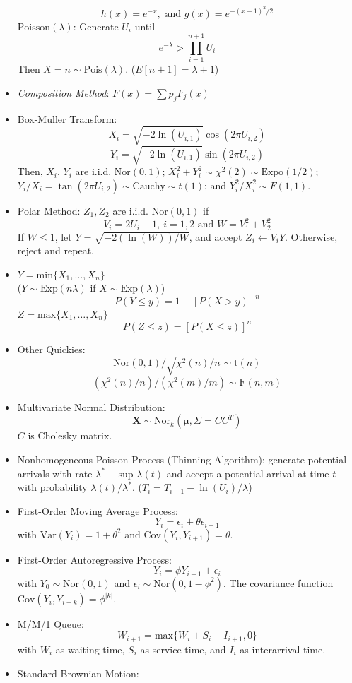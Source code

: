 \documentclass[10pt, twocolumn]{article}
\begin{document}
\begin{itemize}
\[ h(x) = e^{-x}, \text{ and } g(x) = e^{-(x-1)^2/2} \]
$\text{Poisson}(\lambda)$: Generate $U_i$ until 
\[ e^{-\lambda} > \prod_{i=1}^{n+1}U_i \] 
Then $X=n \sim \text{Pois}(\lambda)$. ($E[n+1]=\lambda+1$)
\item \emph{Composition Method}: $F(x)=\sum p_jF_j(x)$
\item Box-Muller Transform: 
\[ X_i=\sqrt{-2\ln(U_{i,1})}\cos(2\pi U_{i,2}) \] 
\[ Y_i=\sqrt{-2\ln(U_{i,1})}\sin(2\pi U_{i,2}) \]
Then, $X_i$, $Y_i$ are i.i.d. $\text{Nor}(0,1)$; $X_i^2+Y_i^2 \sim \chi^2(2) \sim \text{Expo}(1/2)$; $Y_i/X_i = \tan(2 \pi U_{i,2}) \sim \text{Cauchy} \sim t(1)$; and $Y_i^2/X_i^2 \sim F(1,1)$. 
\item Polar Method: $Z_1, Z_2$ are i.i.d. $\text{Nor}(0,1)$ if 
\[ V_i = 2U_i-1,\ i=1,2 \text{ and } W=V_1^2+V_2^2 \]
If $W \leq 1$, let $Y=\sqrt{-2(\ln(W))/W}$, and accept $Z_i \leftarrow V_iY$. Otherwise, reject and repeat. 
\item $Y=\text{min}\{X_1,\dots,X_n\}$ \\
($Y \sim \text{Exp}(n\lambda)$ if $X \sim \text{Exp}(\lambda)$)
\[ P(Y \leq y) = 1-[P(X>y)]^n \]
$Z=\text{max}\{X_1,\dots,X_n\}$
\[ P(Z \leq z) = [P(X \leq z)]^n \]
\item Other Quickies: 
\[ \text{Nor}(0,1)/\sqrt{\chi^2(n)/n} \sim \text{t}(n) \]
\[ (\chi^2(n)/n)/(\chi^2(m)/m) \sim \text{F}(n,m) \]
\item Multivariate Normal Distribution: 
\[ \boldsymbol{X} \sim \text{Nor}_k(\boldsymbol{\mu},\Sigma=CC^T) \]
$C$ is Cholesky matrix.
\item Nonhomogeneous Poisson Process (Thinning Algorithm): generate potential arrivals with rate $\lambda^* \equiv \text{sup } \lambda(t)$ and accept a potential arrival at time $t$ with probability $\lambda(t)/\lambda^*$. ($T_i=T_{i-1}-\ln(U_i)/\lambda$)
\item First-Order Moving Average Process: 
\[ Y_i= \epsilon_i + \theta\epsilon_{i-1} \]
with $\text{Var}(Y_i)=1+\theta^2$ and $\text{Cov}(Y_i,Y_{i+1})=\theta$.
\item First-Order Autoregressive Process: 
\[ Y_i = \phi Y_{i-1} + \epsilon_i \]
with $Y_0 \sim \text{Nor}(0,1)$ and $\epsilon_i \sim \text{Nor}(0,1-\phi^2)$. The covariance function $\text{Cov}(Y_i,Y_{i+k})=\phi^{|k|}$.
\item M/M/1 Queue: 
\[ W_{i+1}=\text{max}\{W_i+S_i-I_{i+1},0\} \]
with $W_i$ as waiting time, $S_i$ as service time, and $I_i$ as interarrival time. 
\item Standard Brownian Motion: 
\begin{inparaenum}

\end{inparaenum}
\end{itemize}
\end{document}
